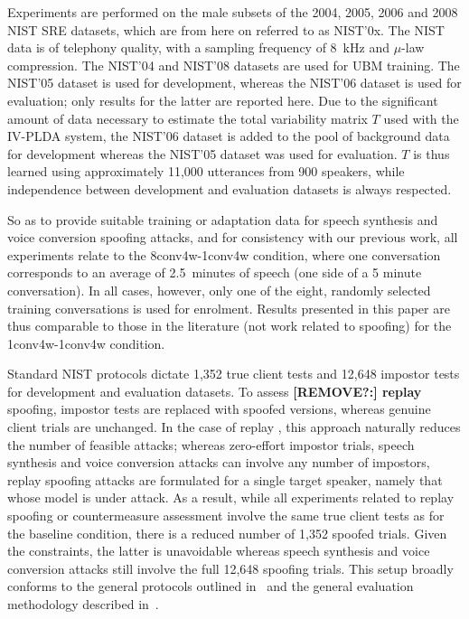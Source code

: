 
Experiments are performed on the male subsets of the 2004, 2005, 2006 and 2008 NIST SRE datasets, which are from here on referred to as NIST'0x.  The NIST data is of telephony quality, with a sampling frequency of 8~kHz and $\mu$-law compression.
The NIST'04 and NIST'08 datasets are used for UBM training.
The NIST'05 dataset is used for development, whereas the NIST'06 dataset is used for evaluation;  
only results for the latter are reported here.
Due to the significant amount of data necessary to estimate the total variability matrix $T$ used with the IV-PLDA system, the NIST'06 dataset is added to the pool of background data for development whereas the NIST'05 dataset was used for evaluation. 
$T$ is thus learned using approximately 11,000 utterances from 900 speakers, while independence between development and evaluation datasets is always respected.
 
So as to provide suitable training or adaptation data for speech synthesis and voice conversion spoofing attacks, and for consistency with our previous work, all experiments relate to the 8conv4w-1conv4w condition, where one conversation corresponds to an average of 2.5~minutes of speech (one side of a 5 minute conversation).
In all cases, however, only one of the eight, randomly selected training conversations is used for enrolment. 
Results presented in this paper are thus comparable to those in the literature (not work related to spoofing) for the 1conv4w-1conv4w condition. 

Standard NIST protocols dictate 1,352 true client tests and 12,648 impostor tests for development and evaluation datasets. 
To assess {\bfseries [REMOVE?:] replay } spoofing, impostor tests are replaced with spoofed versions, whereas genuine client trials are unchanged.
In the case of replay , this approach naturally reduces the number of feasible attacks; whereas zero-effort impostor trials, speech synthesis and voice conversion attacks can involve any number of impostors, replay spoofing attacks are formulated for a single target speaker, namely that whose model is under attack.  As a result, while all experiments related to replay spoofing or countermeasure assessment involve the same true client tests as for the baseline condition, there is a reduced number of 1,352 spoofed trials.  Given the constraints, the latter is unavoidable whereas speech synthesis and voice conversion attacks still involve the full 12,648 spoofing trials.  This setup broadly conforms to the general protocols outlined in~\cite{Wu2014a,Wu2015} and the general evaluation methodology described in~\cite{Hadid2015}.

